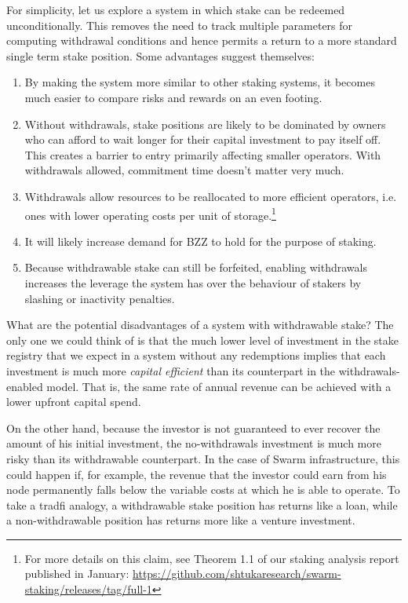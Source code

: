 For simplicity, let us explore a system in which stake can be redeemed unconditionally.
%
This removes the need to track multiple parameters for computing withdrawal conditions and hence permits a return to a more standard single term stake position.
%
Some advantages suggest themselves:
%
\begin{enumerate}
  \item
    By making the system more similar to other staking systems, it becomes much easier to compare risks and rewards on an even footing.
  \item
    Without withdrawals, stake positions are likely to be dominated by owners who can afford to wait longer for their capital investment to pay itself off. This creates a barrier to entry primarily affecting smaller operators. With withdrawals allowed, commitment time doesn't matter very much.
  \item
    Withdrawals allow resources to be reallocated to more efficient operators, i.e. ones with lower operating costs per unit of storage.\footnote{For more details on this claim, see Theorem 1.1 of our staking analysis report published in January: \url{https://github.com/shtukaresearch/swarm-staking/releases/tag/full-1}}
  \item
    It will likely increase demand for BZZ to hold for the purpose of staking.
  \item
    Because withdrawable stake can still be forfeited, enabling withdrawals increases the leverage the system has over the behaviour of stakers by slashing or inactivity penalties.

\end{enumerate}


What are the potential disadvantages of a system with withdrawable stake?
%
The only one we could think of is that the much lower level of investment in the stake registry that we expect in a system without any redemptions implies that each investment is much more \emph{capital efficient} than its counterpart in the withdrawals-enabled model.
%
That is, the same rate of annual revenue can be achieved with a lower upfront capital spend.


On the other hand, because the investor is not guaranteed to ever recover the amount of his initial investment, the no-withdrawals investment is much more risky than its withdrawable counterpart.
%
In the case of Swarm infrastructure, this could happen if, for example, the revenue that the investor could earn from his node permanently falls below the variable costs at which he is able to operate.
%
To take a tradfi analogy, a withdrawable stake position has returns like a loan, while a non-withdrawable position has returns more like a venture investment.